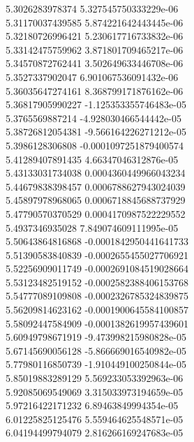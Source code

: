 {5.3026283978374 5.327545750333229e-06 \\
5.31170037439585 5.874221642443445e-06 \\
5.32180726996421 5.230617716733832e-06 \\
5.33142475759962 3.871801709465217e-06 \\
5.34570872762441 3.502649633446708e-06 \\
5.3527337902047 6.901067536091432e-06 \\
5.36035647274161 8.368799171876162e-06 \\
5.36817905990227 -1.125353355746483e-05 \\
5.3765569887214 -4.928030466544442e-05 \\
5.38726812054381 -9.566164226271212e-05 \\
5.3986128306808 -0.0001097251879400574 \\
5.41289407891435 4.66347046312876e-05 \\
5.43133031734038 0.0004360449966043234 \\
5.44679838398457 0.0006788627943024039 \\
5.45897978968065 0.0006718845688737929 \\
5.47790570370529 0.0004170987522229552 \\
5.4937346935028 7.849074609111995e-05 \\
5.50643864816868 -0.0001842950441641733 \\
5.51390583840839 -0.0002655455027706921 \\
5.52256909011749 -0.0002691084519028664 \\
5.53123482519152 -0.0002582388406153768 \\
5.54777089109808 -0.0002326785324839875 \\
5.56209814623162 -0.0001900645584100857 \\
5.58092447584909 -0.0001382619957439601 \\
5.60949798671919 -9.473998215980828e-05 \\
5.67145690056128 -5.866669016540982e-05 \\
5.77980116850739 -1.910449100250844e-05 \\
5.85019883289129 5.569233053392963e-06 \\
5.92085069549069 3.315033973194659e-05 \\
5.97216422171232 6.89463849994354e-05 \\
6.01225825125476 5.559464625548571e-05 \\
6.04194499794079 2.816266169247683e-05 \\
}
